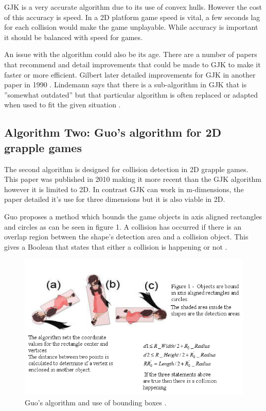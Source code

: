 \documentclass{scrartcl}
\begin{document}
GJK is a very accurate algorithm due to its use of convex hulls. However the cost of this accuracy is speed. In a 2D platform game speed is vital, a few seconds lag for each collision would make the game unplayable. While accuracy is important it should be balanced with speed for games.

An issue with the algorithm could also be its age. There are a number of papers that recommend and detail improvements that could be made to GJK to make it faster or more efficient. Gilbert later detailed improvements for GJK in another paper in 1990 \cite{Gilbert2}.  Lindemann says that there is a sub-algorithm in GJK that is ''somewhat outdated'' but that particular algorithm is often replaced or adapted when used to fit the given situation \cite[p. 1]{lindemanngjk}.
	
\subsection{Algorithm Two: Guo's algorithm for 2D grapple games}
The second algorithm is designed for collision detection in 2D grapple games. This paper was published in 2010 making it more recent than the GJK algorithm however it is limited to 2D. In contrast GJK can work in m-dimensions, the paper detailed it’s use for three dimensions but it is also viable in 2D.  
	
Guo proposes a method which bounds the game objects in axis aligned rectangles and circles as can be seen in figure 1. A collision has occurred if there is an overlap region between the shape's detection area and a collision object. This gives a Boolean that states that either a collision is happening or not \cite{Guo}.
\newline
\begin{figure}[h]
	\includegraphics[width=1.0\linewidth]{A3figure1.png}
	\caption{ Guo's algorithm and use of bounding boxes \cite{Guo}.}
\end{figure}	
\end{document}
